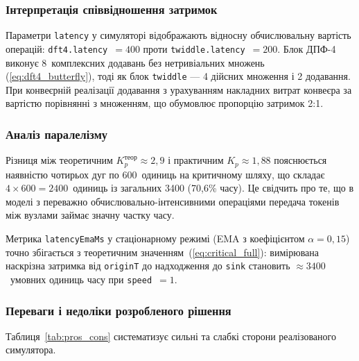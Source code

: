 \subsubsection*{Інтерпретація співвідношення затримок}

Параметри \texttt{latency} у симуляторі відображають відносну
обчислювальну вартість операцій: \texttt{dft4.latency}~$=400$
проти \texttt{twiddle.latency}~$=200$. Блок ДПФ-4 виконує
8~комплексних додавань без нетривіальних множень (\ref{eq:dft4_butterfly}),
тоді як блок \texttt{twiddle} --- 4 дійсних множення і 2 додавання.
При конвеєрній реалізації додавання з урахуванням накладних витрат
конвеєра за вартістю порівнянні з множенням, що обумовлює пропорцію
затримок 2:1.

\subsubsection*{Аналіз паралелізму}

Різниця між теоретичним $K_p^{\text{теор}} \approx 2{,}9$ і практичним
$K_p \approx 1{,}88$ пояснюється наявністю чотирьох дуг по 600~одиниць
на критичному шляху, що складає $4 \times 600 = 2400$~одиниць
із загальних 3400 (70,6\% часу). Це свідчить про те, що в моделі
з переважно обчислювально-інтенсивними операціями передача токенів
між вузлами займає значну частку часу.

Метрика \texttt{latencyEmaMs} у стаціонарному режимі (EMA з коефіцієнтом
$\alpha = 0{,}15$) точно збігається з теоретичним
значенням~(\ref{eq:critical_full}): вимірювана наскрізна затримка від
\texttt{originT} до надходження до \texttt{sink} становить
$\approx 3400$~умовних одиниць часу при \texttt{speed}~$= 1$.

\subsubsection*{Переваги і недоліки розробленого рішення}

Таблиця~\ref{tab:pros_cons} систематизує сильні та слабкі сторони
реалізованого симулятора.


